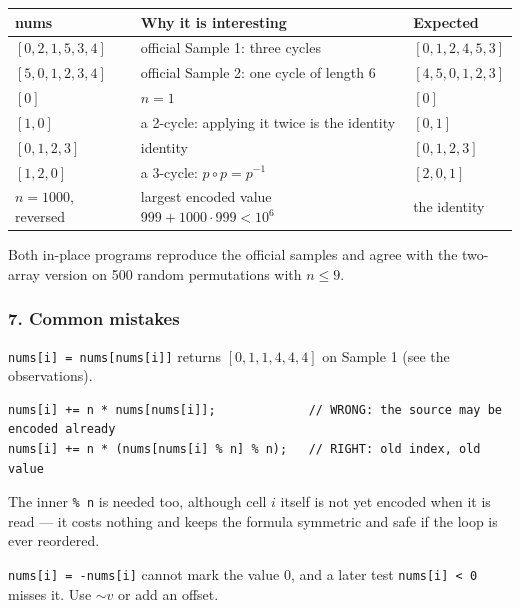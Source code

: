 \begin{testbox}
\centering\small
\begin{tabular}{@{}lll@{}}
\toprule
\textbf{nums} & \textbf{Why it is interesting} & \textbf{Expected} \\
\midrule
$[0,2,1,5,3,4]$ & official Sample 1: three cycles & $[0,1,2,4,5,3]$ \\
$[5,0,1,2,3,4]$ & official Sample 2: one cycle of length 6 & $[4,5,0,1,2,3]$ \\
$[0]$ & $n = 1$ & $[0]$ \\
$[1,0]$ & a 2-cycle: applying it twice is the identity & $[0,1]$ \\
$[0,1,2,3]$ & identity & $[0,1,2,3]$ \\
$[1,2,0]$ & a 3-cycle: $p \circ p = p^{-1}$ & $[2,0,1]$ \\
$n = 1000$, reversed & largest encoded value $999 + 1000 \cdot 999 < 10^6$ & the identity \\
\bottomrule
\end{tabular}

\medskip
Both in-place programs reproduce the official samples and agree with the two-array version on 500 random permutations with $n \le 9$.
\end{testbox}

\subsubsection*{7. Common mistakes}

\begin{warningbox}
\texttt{nums[i] = nums[nums[i]]} returns $[0,1,1,4,4,4]$ on Sample 1 (see the observations).
\end{warningbox}

\begin{warningbox}
\begin{lstlisting}[style=snippet]
nums[i] += n * nums[nums[i]];             // WRONG: the source may be encoded already
nums[i] += n * (nums[nums[i] % n] % n);   // RIGHT: old index, old value
\end{lstlisting}
The inner \texttt{\% n} is needed too, although cell $i$ itself is not yet encoded when it is read --- it costs nothing and keeps the formula symmetric and safe if the loop is ever reordered.
\end{warningbox}

\begin{warningbox}
\texttt{nums[i] = -nums[i]} cannot mark the value 0, and a later test \texttt{nums[i] < 0} misses it. Use $\sim v$ or add an offset.
\end{warningbox}

